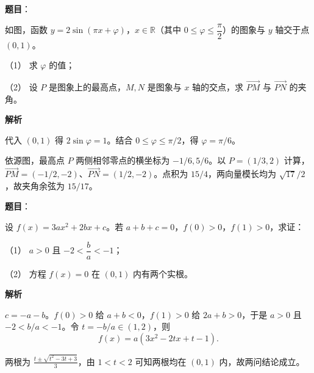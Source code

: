 \begin{answer}

\textbf{题目}：

如图，函数 $y=2\sin(\pi x+\varphi)$，$x\in\mathbb R$（其中 $0\leqslant\varphi\leqslant\dfrac{\pi}{2}$）的图象与 $y$ 轴交于点 $(0,1)$。

（1） 求 $\varphi$ 的值；

（2） 设 $P$ 是图象上的最高点，$M,N$ 是图象与 $x$ 轴的交点，求 $\overrightarrow{PM}$ 与 $\overrightarrow{PN}$ 的夹角。
\nopagebreak[4]
\begin{center}\end{center}
\nopagebreak[4]
\textbf{解析}


代入 $(0,1)$ 得 $2\sin\varphi=1$。结合 $0\le\varphi\le\pi/2$，得 $\varphi=\pi/6$。


依源图，最高点 $P$ 两侧相邻零点的横坐标为 $-1/6,5/6$。以 $P=(1/3,2)$ 计算，$\overrightarrow{PM}=(-1/2,-2)$、$\overrightarrow{PN}=(1/2,-2)$。点积为 $15/4$，两向量模长均为 $\sqrt{17}/2$，故夹角余弦为 $15/17$。



\end{answer}
\begin{answer}

\textbf{题目}：

设 $f(x)=3ax^2+2bx+c$。若 $a+b+c=0$，$f(0)>0$，$f(1)>0$，求证：

（1） $a>0$ 且 $-2<\dfrac ba<-1$；

（2） 方程 $f(x)=0$ 在 $(0,1)$ 内有两个实根。

\textbf{解析}


$c=-a-b$。$f(0)>0$ 给 $a+b<0$，$f(1)>0$ 给 $2a+b>0$，于是 $a>0$ 且 $-2<b/a<-1$。令 $t=-b/a\in(1,2)$，则
\nopagebreak[4]
\[
f(x)=a(3x^2-2tx+t-1).
\]


两根为 $\frac{t\pm\sqrt{t^2-3t+3}}3$，由 $1<t<2$ 可知两根均在 $(0,1)$ 内，故两问结论成立。



\end{answer}
